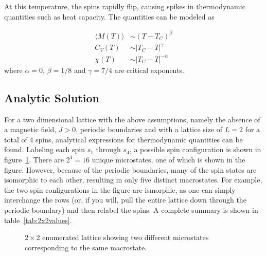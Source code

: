 \documentclass[aps,reprint]{revtex4-1}
\newcommand{\mean}[1]{\langle #1 \rangle}
\begin{document}
At this
temperature, the spins rapidly flip, causing spikes in thermodynamic quantities such as
heat capacity. The quantities can be modeled as~\cite{project3}


\begin{align*}
  \mean{M(T)} &\sim (T - T_C)^\beta \\
  C_V(T) &\sim |T_C - T|^\gamma \\
  \chi (T) &\sim |T_C - T|^{-\alpha}
\end{align*}
where $\alpha = 0$, $\beta = 1/8$ and $\gamma = 7/4$ are critical exponents.

\subsection{Analytic Solution}
\label{sec:analytic-solution-}

For a two dimensional lattice with the above assumptions, namely the absence of a magnetic field, \(J>0\),
periodic boundaries and with a lattice size of \(L=2\) for a total of \(4\)
spins, analytical expressions for thermodynamic quantities can be found.
Labeling each spin \(s_{1}\) through \(s_{4}\), a possible spin configuration is
shown in figure~\ref{fig:22lattice}. There are \(2^{4}=16\) unique microstates, one
of which is shown in the figure. However, because of the periodic boundaries,
many of the spin states are isomorphic to each other, resulting in only five
distinct macrostates. For example, the two spin configurations in the figure are
ismorphic, as one can simply interchange the rows (or, if you will, pull the
entire lattice down through the periodic boundary) and then relabel the spins. A
complete summary is shown in table~\ref{tab:2x2values}.

\begin{figure}[H]
  \centering
  \caption{$2 \times 2$ enumerated lattice showing two different microstates
    corresponding to the same macrostate.}
  \label{fig:22lattice}
\end{figure}
\end{document}
